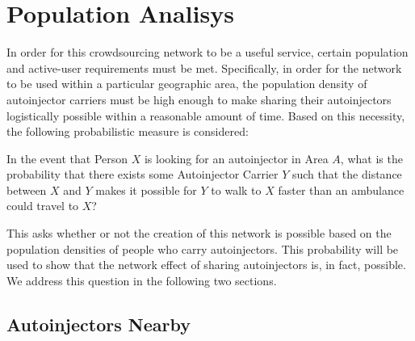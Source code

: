 \section{Population Analisys} \label{numbers}

\onehalfspacing

In order for this crowdsourcing network to be a useful service, certain population and active-user requirements must be met. Specifically, in order for the network to be used within a particular geographic area, the population density of autoinjector carriers must be high enough to make sharing their autoinjectors logistically possible within a reasonable amount of time. Based on this necessity, the following probabilistic measure is considered:\newline
\begin{adjustwidth}{2.5em}{0pt}
    In the event that Person $X$ is looking for an autoinjector in Area $A$, what is the probability that there exists some Autoinjector Carrier $Y$ such that the distance between $X$ and $Y$ makes it possible for $Y$ to walk to $X$ faster than an ambulance could travel to $X$?
\end{adjustwidth}
\noindent\newline This asks whether or not the creation of this network is possible based on the population densities of people who carry autoinjectors. This probability will be used to show that the network effect of sharing autoinjectors is, in fact, possible. We address this question in the following two sections.


\subsection{Autoinjectors Nearby} \label{autoinjectors-nearby}

